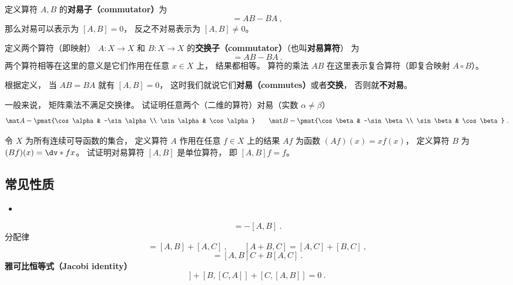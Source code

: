 
定义算符 $A,B$ 的\textbf{对易子（commutator）}为
\begin{equation}
[A, B] = AB - BA~,
\end{equation}
那么对易可以表示为 $[A,B] = 0$， 反之不对易表示为 $[A,B]\ne 0$。



定义两个算符（即映射） $A: X\to X$ 和 $B: X\to X$ 的\textbf{交换子（commutator）}（也叫\textbf{对易算符}） 为
\begin{equation}
[A, B] = A B - B A~.
\end{equation}
两个算符相等在这里的意义是它们作用在任意 $x \in X$ 上， 结果都相等。 算符的乘法 $AB$ 在这里表示复合算符（即复合映射 $A\circ B$）。

根据定义， 当 $A B = B A$ 就有 $[A, B] = 0$， 这时我们就说它们\textbf{对易（commutes）}或者\textbf{交换}， 否则就\textbf{不对易}。

\begin{exercise}{}
一般来说， 矩阵乘法不满足交换律。 试证明任意两个（二维的算符）对易（实数 $\alpha \ne \beta$）
\begin{equation}
\mat A  = \pmat{\cos\alpha & -\sin\alpha\\ \sin\alpha & \cos\alpha}
\qquad
\mat B  = \pmat{\cos\beta & -\sin\beta\\ \sin\beta & \cos\beta}~.
\end{equation}
\end{exercise}

\begin{exercise}{}
令 $X$ 为所有连续可导函数的集合， 定义算符 $A$ 作用在任意 $f\in X$ 上的结果 $Af$ 为函数 $(Af)(x) = x f(x)$， 定义算符 $B$ 为 $(Bf)(x) = \dv*{f}{x}$。 试证明对易算符 $[A, B]$ 是单位算符， 即 $[A, B]f = f$。
\end{exercise}

\subsection{常见性质}
\begin{itemize}
\item 
\end{itemize}
\begin{equation}
[B, A] = -[A, B]~.
\end{equation}
分配律
\begin{equation}
[A, B + C] = [A, B] + [A, C]~,
\qquad
[A + B, C] = [A, C] + [B, C]~,
\end{equation}
\begin{equation}
[A, BC] = [A, B]C + B[A, C]~.
\end{equation}
\textbf{雅可比恒等式（Jacobi identity）}
\begin{equation}
[A, [B, C]] + [B, [C, A]] + [C, [A, B]] = 0~.
\end{equation}
